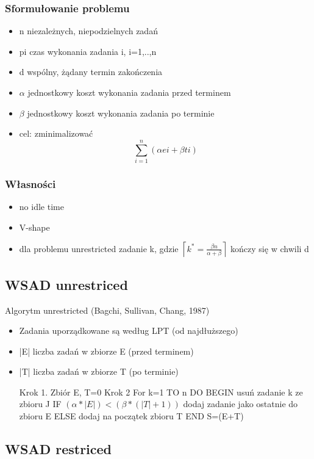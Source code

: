 \documentclass[12pt,a4paper]{article}
\begin{document}
\subsubsection{Sformułowanie problemu}
\begin{itemize}
\item n niezależnych, niepodzielnych zadań
\item pi czas wykonania zadania i, i=1,..,n
\item d wspólny, żądany termin zakończenia
\item $\alpha$ jednostkowy koszt wykonania zadania przed terminem
\item $\beta$ jednostkowy koszt wykonania zadania po terminie
\item cel: zminimalizować \begin{equation}
\sum\limits_{i=1}^{n}(\alpha ei+\beta ti)
\end{equation}
\end{itemize}
\subsubsection{Własności}
\begin{itemize}
\item no idle time
\item V-shape
\item dla problemu unrestricted zadanie k, gdzie $\left \lceil k^*=\frac{\beta n}{\alpha + \beta} \right \rceil$ kończy się w chwili d
\end{itemize}

\subsection{WSAD unrestriced}
Algorytm unrestricted (Bagchi, Sullivan, Chang, 1987)
\begin{itemize}
\item Zadania uporządkowane są według LPT (od najdłuższego)
\item |E| liczba zadań w zbiorze E (przed terminem)
\item |T| liczba zadań w zbiorze T (po terminie)

Krok 1. Zbiór E, T=0
Krok 2 For k=1 TO n DO
BEGIN
usuń zadanie k ze zbioru J
IF $(\alpha * |E|)<(\beta *(|T|+1))$ dodaj zadanie jako ostatnie do zbioru E
ELSE dodaj na początek zbioru T
END
S=(E+T)
\end{itemize}
\subsection{WSAD restriced}
\end{document}

